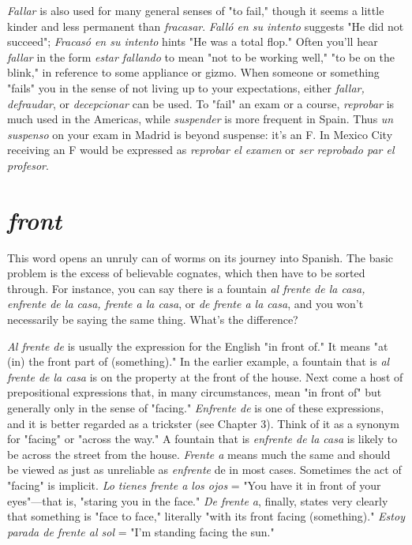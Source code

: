 \emph{Fallar} is also used for many general senses of "to
fail," though it seems a little kinder and less permanent than \emph{fracasar}.
\emph{Falló en su intento} suggests "He did not succeed"; \emph{Fracasó en su intento} hints "He was a total flop." Often you'll hear \emph{fallar} in the form
\emph{estar fallando} to mean "not to be working well," "to be on the blink,"
in reference to some appliance or gizmo. When someone or something
"fails" you in the sense of not living up to your expectations, either
\emph{fallar, defraudar}, or \emph{decepcionar} can be used. To "fail" an exam or a
course, \emph{reprobar} is much used in the Americas, while \emph{suspender} is
more frequent in Spain. Thus \emph{un suspenso} on your exam in Madrid is
beyond suspense: it's an F. In Mexico City receiving an F would be expressed as \emph{reprobar el examen} or \emph{ser reprobado par el profesor}.

\section{\emph{front}}

This word opens an unruly can of worms on its journey into
Spanish. The basic problem is the excess of believable cognates, which
then have to be sorted through. For instance, you can say there is a
fountain \emph{al frente de la casa, enfrente de la casa, frente a la casa}, or
\emph{de frente a la casa}, and you won't necessarily be saying the same
thing. What's the difference?

\emph{Al frente de} is usually the expression for the English "in front
of." It means "at (in) the front part of (something)." In the earlier example, a fountain that is \emph{al frente de la casa} is on the property at the
front of the house. Next come a host of prepositional expressions that,
in many circumstances, mean "in front of" but generally only in the
sense of "facing." \emph{Enfrente de} is one of these expressions, and it is better regarded as a trickster (see Chapter 3). Think of it as a synonym for
"facing" or "across the way." A fountain that is \emph{enfrente de la casa} is
likely to be across the street from the house. \emph{Frente a} means much the
same and should be viewed as just as unreliable as \emph{enfrente} de in most
cases. Sometimes the act of "facing" is implicit. \emph{Lo tienes frente a los
ojos} = "You have it in front of your eyes"---that is, "staring you in the
face." \emph{De frente a}, finally, states very clearly that something is "face
to face," literally "with its front facing (something)." \emph{Estoy parada de
frente al sol} = "I'm standing facing the sun."


